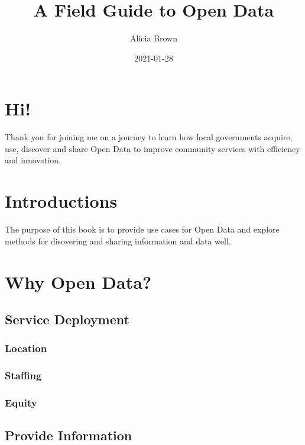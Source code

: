 \documentclass[
]{book}
\title{A Field Guide to Open Data}
\author{Alicia Brown}
\date{2021-01-28}
\begin{document}
\maketitle

{
\setcounter{tocdepth}{1}
\tableofcontents
}
\hypertarget{hi}{%
\chapter{Hi!}\label{hi}}

Thank you for joining me on a journey to learn how local governments acquire, use, discover and share Open Data to improve community services with efficiency and innovation.

\hypertarget{intro}{%
\chapter{Introductions}\label{intro}}

The purpose of this book is to provide use cases for Open Data and explore methods for disovering and sharing information and data well.

\hypertarget{why-open-data}{%
\chapter{Why Open Data?}\label{why-open-data}}

\hypertarget{service-deployment}{%
\section{Service Deployment}\label{service-deployment}}

\hypertarget{location}{%
\subsection{Location}\label{location}}

\hypertarget{staffing}{%
\subsection{Staffing}\label{staffing}}

\hypertarget{equity}{%
\subsection{Equity}\label{equity}}

\hypertarget{provide-information}{%
\section{Provide Information}\label{provide-information}}
\end{document}
